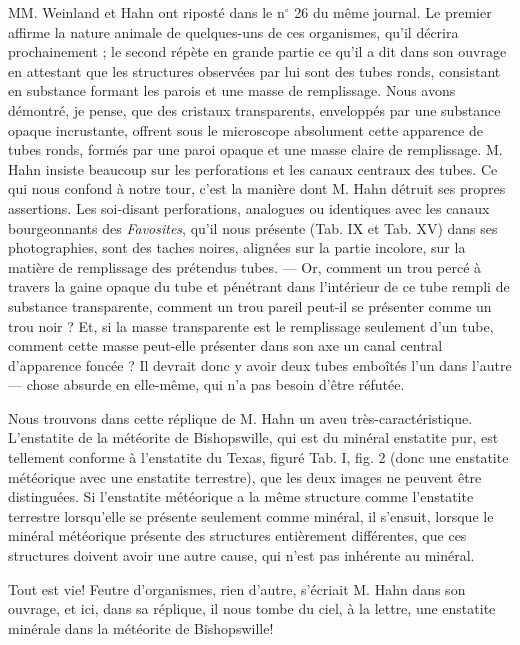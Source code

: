 \documentclass[a4paper, 12pt, oneside, french]{book}
\begin{document}
MM. Weinland et Hahn ont riposté dans le n$^{\circ}$ 26 du même journal. Le premier affirme la nature animale de quelques-uns de ces organismes, qu'il décrira prochainement ; le second répète en grande partie ce qu'il a dit dans son ouvrage en attestant que les structures observées par lui sont des tubes ronds, consistant en \og substance formant les parois et une masse de remplissage. \fg Nous avons démontré, je pense, que des cristaux transparents, enveloppés par une substance opaque incrustante, offrent sous le microscope absolument cette apparence de tubes ronds, formés par une paroi opaque et une masse claire de remplissage. M. Hahn insiste beaucoup sur les perforations et les canaux centraux des tubes. Ce qui nous confond à notre tour, c'est la manière dont M. Hahn détruit ses propres assertions. Les soi-disant perforations, analogues ou identiques avec les canaux bourgeonnants des \emph{Favosites}, qu'il nous présente (Tab. IX et Tab. XV) dans ses photographies, sont des taches noires, alignées sur la partie incolore, sur la matière de remplissage des prétendus tubes. --- Or, comment un trou percé à travers la gaine opaque du tube et pénétrant dans l'intérieur de ce tube rempli de substance transparente, comment un trou pareil peut-il se présenter comme un trou noir ? Et, si la masse transparente est le remplissage seulement d'un tube, comment cette masse peut-elle présenter dans son axe un canal central d'apparence foncée ? Il devrait donc y avoir deux tubes emboîtés l'un dans l'autre --- chose absurde en elle-même, qui n'a pas besoin d'être réfutée.

Nous trouvons dans cette réplique de M. Hahn un aveu très-caractéristique. \og L'enstatite de la météorite de Bishopswille, qui est du minéral enstatite pur, est tellement conforme à l'enstatite du Texas, figuré Tab. I, fig. 2 (donc une enstatite météorique avec une enstatite terrestre), que les deux images ne peuvent être distinguées. Si l'enstatite météorique a la même structure comme l'enstatite terrestre lorsqu'elle se présente seulement comme minéral, il s'ensuit, lorsque le minéral météorique présente des structures entièrement différentes, que ces structures doivent avoir une autre cause, qui n'est pas inhérente au minéral. \fg

\og Tout est vie! Feutre d'organismes, rien d'autre, \fg s'écriait M. Hahn dans son ouvrage, et ici, dans sa réplique, il nous tombe du ciel, à la lettre, une enstatite minérale dans la météorite de Bishopswille!
\end{document}
